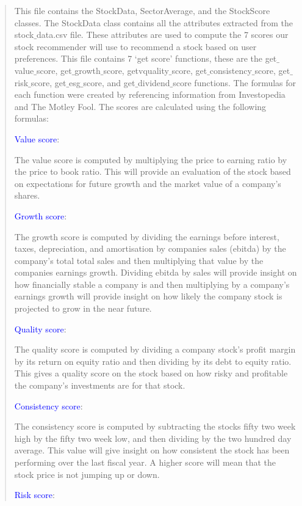 \documentclass[fontsize=12pt]{article}
\begin{document}
\begin{quote}
\noindent
This file contains the StockData, SectorAverage, and the StockScore classes. The StockData class contains all the attributes extracted from the stock$\_$data.csv file. These attributes are used to compute the 7 scores our stock recommender will use to recommend a stock based on user preferences. This file contains 7 ‘get score’ functions, these are the get$\_$value$\_$score, get$\_$growth$\_$score, getvquality$\_$score, get$\_$consistency$\_$score, get$\_$risk$\_$score, get$\_$esg$\_$score, and get$\_$dividend$\_$score functions. The formulas for each function were created by referencing information from Investopedia and The Motley Fool. The scores are calculated using the following formulas:

\textcolor{blue}{Value score}:

The value score is computed by multiplying the price to earning ratio by the price to book ratio. This will provide an evaluation of the stock based on expectations for future growth and the market value of a company’s shares.

\textcolor{blue}{Growth score}:

The growth score is computed by dividing the earnings before interest, taxes, depreciation, and amortisation by companies sales (ebitda) by the company’s total total sales and then multiplying that value by the companies earnings growth. Dividing ebitda by sales will provide insight on how financially stable a company is and then multiplying by a company's earnings growth will provide insight on how likely the company stock is projected to grow in the near future.

\textcolor{blue}{Quality score}:

The quality score is computed by dividing a company stock's profit margin by its return on equity ratio and then dividing by its debt to equity ratio. This gives a quality score on the stock based on how risky and profitable the company's investments are for that stock.

\textcolor{blue}{Consistency score}:

The consistency score is computed by subtracting the stocks fifty two week high by the fifty two week low, and then dividing by the two hundred day average. This value will give insight on how consistent the stock has been performing over the last fiscal year. A higher score will mean that the stock price is not jumping up or down. 

\textcolor{blue}{Risk score}:


\end{quote}
\end{document}
